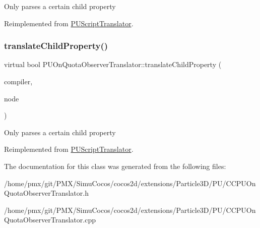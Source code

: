 Only parses a certain child property 

Reimplemented from \hyperlink{classPUScriptTranslator_a0374d83a8a04e57918975d525e0f8fe8}{P\+U\+Script\+Translator}.

\mbox{\label{classPUOnQuotaObserverTranslator_a26a0c21622c0dd95503071e42dc72fcf}} 
\subsubsection{\texorpdfstring{translate\+Child\+Property()}{translateChildProperty()}\hspace{0.1cm}{\footnotesize\ttfamily [2/2]}}
{\footnotesize\ttfamily virtual bool P\+U\+On\+Quota\+Observer\+Translator\+::translate\+Child\+Property (\begin{DoxyParamCaption}\item[{\hyperlink{classPUScriptCompiler}{P\+U\+Script\+Compiler} $\ast$}]{compiler,  }\item[{\hyperlink{classPUAbstractNode}{P\+U\+Abstract\+Node} $\ast$}]{node }\end{DoxyParamCaption})\hspace{0.3cm}{\ttfamily [virtual]}}

Only parses a certain child property 

Reimplemented from \hyperlink{classPUScriptTranslator_a0374d83a8a04e57918975d525e0f8fe8}{P\+U\+Script\+Translator}.



The documentation for this class was generated from the following files\+:\begin{DoxyCompactItemize}
\item 
/home/pmx/git/\+P\+M\+X/\+Simu\+Cocos/cocos2d/extensions/\+Particle3\+D/\+P\+U/C\+C\+P\+U\+On\+Quota\+Observer\+Translator.\+h\item 
/home/pmx/git/\+P\+M\+X/\+Simu\+Cocos/cocos2d/extensions/\+Particle3\+D/\+P\+U/C\+C\+P\+U\+On\+Quota\+Observer\+Translator.\+cpp\end{DoxyCompactItemize}
